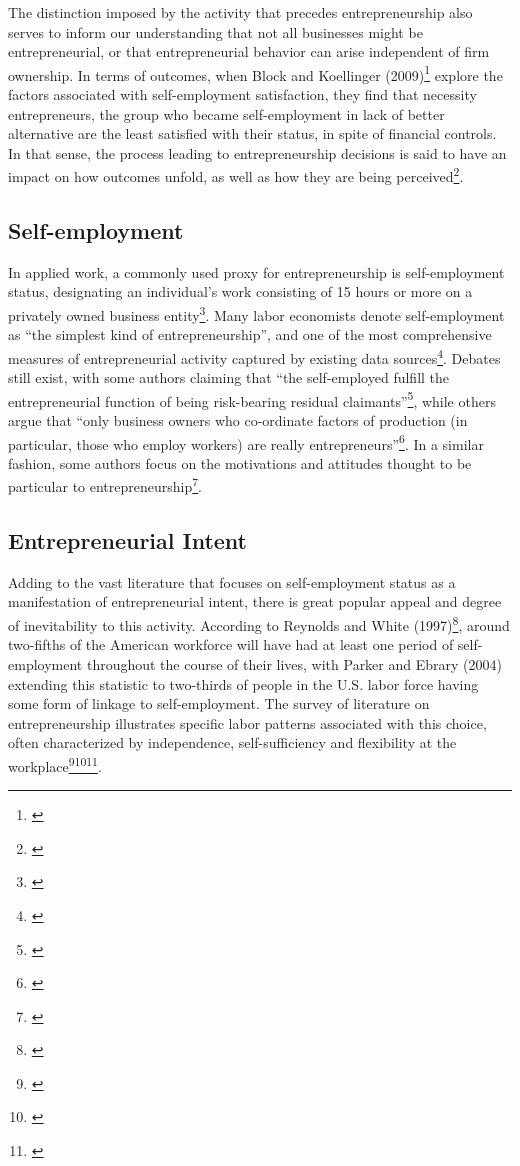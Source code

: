 The distinction imposed by the activity that precedes entrepreneurship also serves to inform our understanding that not all businesses might be entrepreneurial, or that entrepreneurial behavior can arise independent of firm ownership. In terms of outcomes, when Block and Koellinger (2009)\footnote{\cite{BlockKoellinger2009}} explore the factors associated with self-employment satisfaction, they find that necessity entrepreneurs, the group who became self-employment in lack of better alternative are the least satisfied with their status, in spite of financial controls. In that sense, the process leading to entrepreneurship decisions is said to have an impact on how outcomes unfold, as well as how they are being perceived\footnote{\cite{BlockKoellinger2009}}.

\subsection{Self-employment}

In applied work, a commonly used proxy for entrepreneurship is self-employment status, designating an individual's work consisting of 15 hours or more on a privately owned business entity\footnote{\cite{BlanchflowerOswald1998}}. Many labor economists denote self-employment as ``the simplest kind of entrepreneurship'', and one of the most comprehensive measures of entrepreneurial activity captured by existing data sources\footnote{\cite{Parker2004}}. Debates still exist, with some authors claiming that ``the self-employed fulfill the entrepreneurial function of being risk-bearing residual claimants''\footnote{\cite[Page 5]{Parker2004}}, while others argue that ``only business owners who co-ordinate factors of production (in particular, those who employ workers) are really entrepreneurs''\footnote{\cite[Page 5]{Parker2004}}. In a similar fashion, some authors focus on the motivations and attitudes thought to be particular to entrepreneurship\footnote{\cite[Page 5]{Parker2004}}.

\subsection{Entrepreneurial Intent}

Adding to the vast literature that focuses on self-employment status as a manifestation of entrepreneurial intent, there is great popular appeal and degree of inevitability to this activity. According to Reynolds and White (1997)\footnote{\cite{ReynoldsWhite1997}}, around two-fifths of the American workforce will have had at least one period of self-employment throughout the course of their lives, with Parker and Ebrary (2004) extending this statistic to two-thirds of people in the U.S. labor force having some form of linkage to self-employment. The survey of literature on entrepreneurship illustrates specific labor patterns associated with this choice, often characterized by independence, self-sufficiency and flexibility at the workplace\footnote{\cite{RodrguezFierroGarridoNavarro2015}}\hspace{.15em}\footnote{\cite{Parker2004}}\hspace{.15em}\footnote{\cite{Quinn1980}}. 


